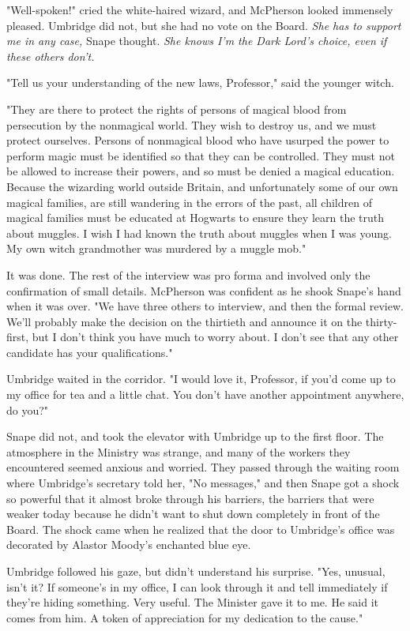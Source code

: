 "Well-spoken!" cried the white-haired wizard, and McPherson looked immensely pleased. Umbridge did not, but she had no vote on the Board. \emph{She has to support me in any case,} Snape thought. \emph{She knows I'm the Dark Lord's choice, even if these others don't.}

"Tell us your understanding of the new laws, Professor," said the younger witch.

"They are there to protect the rights of persons of magical blood from persecution by the nonmagical world. They wish to destroy us, and we must protect ourselves. Persons of nonmagical blood who have usurped the power to perform magic must be identified so that they can be controlled. They must not be allowed to increase their powers, and so must be denied a magical education. Because the wizarding world outside Britain, and unfortunately some of our own magical families, are still wandering in the errors of the past, all children of magical families must be educated at Hogwarts to ensure they learn the truth about muggles. I wish I had known the truth about muggles when I was young. My own witch grandmother was murdered by a muggle mob."

It was done. The rest of the interview was pro forma and involved only the confirmation of small details. McPherson was confident as he shook Snape's hand when it was over. "We have three others to interview, and then the formal review. We'll probably make the decision on the thirtieth and announce it on the thirty-first, but I don't think you have much to worry about. I don't see that any other candidate has your qualifications."

Umbridge waited in the corridor. "I would love it, Professor, if you'd come up to my office for tea and a little chat. You don't have another appointment anywhere, do you?"

Snape did not, and took the elevator with Umbridge up to the first floor. The atmosphere in the Ministry was strange, and many of the workers they encountered seemed anxious and worried. They passed through the waiting room where Umbridge's secretary told her, "No messages," and then Snape got a shock so powerful that it almost broke through his barriers, the barriers that were weaker today because he didn't want to shut down completely in front of the Board. The shock came when he realized that the door to Umbridge's office was decorated by Alastor Moody's enchanted blue eye.

Umbridge followed his gaze, but didn't understand his surprise. "Yes, unusual, isn't it? If someone's in my office, I can look through it and tell immediately if they're hiding something. Very useful. The Minister gave it to me. He said it comes from{\el} him. A token of appreciation for my dedication to the cause."

